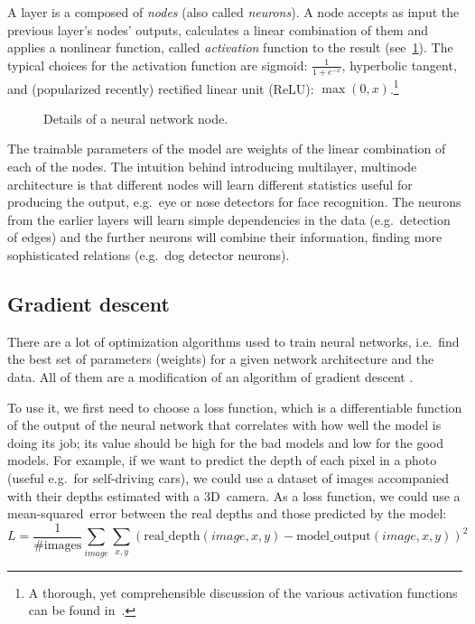 A layer is a composed of \emph{nodes} (also called \emph{neurons}). A node accepts as input the previous layer's nodes' outputs, calculates a linear combination of them and applies a nonlinear function, called \emph{activation} function to the result (see~\ref{ann-nodes}). The typical choices for the activation function are sigmoid: $\frac{1}{1 + e^{-x}}$, hyperbolic tangent, and (popularized recently) rectified linear unit (ReLU): $\max(0, x)$.\footnote{A thorough, yet comprehensible discussion of the various activation functions can be found in~\cite{cs231-actfun}.}
\begin{figure}[h]
  \centering
  \resizebox{0.7\textwidth}{!}{
  
}
  \caption{Details of a neural network node.} \label{ann-nodes}
\end{figure}

The trainable parameters of the model are weights of the linear combination of each of the nodes. The intuition behind introducing multilayer, multinode architecture is that different nodes will learn different statistics useful for producing the output, e.g.~eye or nose detectors for face recognition. The neurons from the earlier layers will learn simple dependencies in the data (e.g.~detection of edges) and the further neurons will combine their information, finding more sophisticated relations (e.g.~dog detector neurons).

\subsection{Gradient descent}\label{gradient descent}
There are a lot of optimization algorithms used to train neural networks, i.e.~find the best set of parameters (weights) for a given network architecture and the data. All of them are a modification of an algorithm of gradient descent \cite{gradient-descent}.

To use it, we first need to choose a loss function, which is a differentiable function of the output of the neural network that correlates with how well the model is doing its job; its value should be high for the bad models and low for the good  models. For example, if we want to predict the depth of each pixel in a photo (useful e.g.~for self-driving cars), we could use a dataset of images accompanied with their depths estimated with a 3D~camera. As a loss function, we could use a mean-squared~error between the real depths and those predicted by the model:
$$
L = \frac{1}{\mbox{\# images}}\sum_{image} \sum_{x, y} (\mbox{real\_depth}(image, x, y) - \mbox{model\_output}(image, x, y))^2
$$


